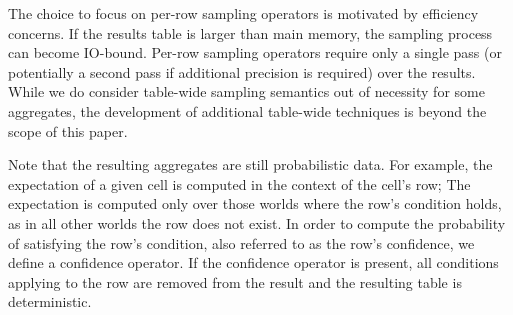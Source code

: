 The choice to focus on per-row sampling operators is motivated by efficiency concerns.  If the results table is larger than main memory, the sampling process can become IO-bound.  Per-row sampling operators require only a single pass (or potentially a second pass if additional precision is required) over the results.  While we do consider table-wide sampling semantics out of necessity for some aggregates, the development of additional table-wide techniques is beyond the scope of this paper.

Note that the resulting aggregates are still probabilistic data.  For example, the expectation of a given cell is computed in the context of the cell's row; The expectation is computed only over those worlds where the row's condition holds, as in all other worlds the row does not exist.  In order to compute the probability of satisfying the row's condition, also referred to as the row's confidence, we define a confidence operator.  If the confidence operator is present, all conditions applying to the row are removed from the result and the resulting table is deterministic.

%
%


